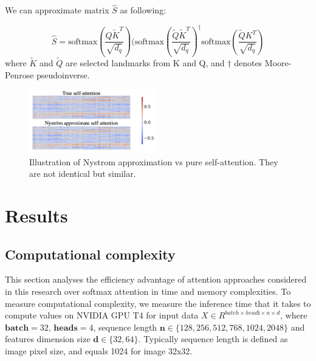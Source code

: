 
We can approximate matrix $\hat{S}$ as following:

$$\hat{S} = \text{softmax}(\frac{Q\tilde{K}^T}{\sqrt{d_q}}) (\text{softmax}(\frac{\tilde{Q}\tilde{K}^T}{\sqrt{d_q}})^{\dagger} \text{softmax}(\frac{\tilde{Q}{K}^T}{\sqrt{d_q}})$$
where $\tilde{K}$ and $\tilde{Q}$ are selected landmarks from K and Q, and $\dagger$ denotes Moore-Penrose pseudoinverse.  

\begin{figure}[h]
\centering
\includegraphics[width=0.5\textwidth]{nystrom-approximation.png}
\caption{\label{fig:nystrom-approximation}Illustration of Nystrom approximation vs pure self-attention. They are not identical but similar.}
\end{figure}

\section{Results}

\subsection{Computational complexity}

This section analyses the efficiency advantage of attention approaches considered in this research over softmax attention in time and memory complexities. 
To measure computational complexity, we measure the inference time that it takes to compute values on NVIDIA GPU T4 for input data $ X \in R^{ batch \times headі \times n \times d}$, where $\textbf{batch}=32$, $\textbf{heads}=4$, sequence length $\textbf{n} \in \{128, 256, 512, 768, 1024, 2048\}$ and features dimension size $\textbf{d} \in \{32, 64\}$.
Typically sequence length is defined as image pixel size, and equals 1024 for image 32x32.


